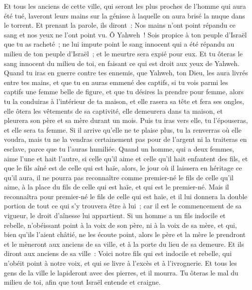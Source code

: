 \begin{multicols}{2}
Et tous les anciens de cette ville, qui seront les plus proches de l'homme qui aura été tué, laveront leurs mains sur la génisse à laquelle on aura brisé la nuque dans le torrent.
Et prenant la parole, ils diront~: Nos mains n'ont point répandu ce sang et nos yeux ne l'ont point vu.
Ô Yahweh~! Sois propice à ton peuple d'Israël que tu as racheté~; ne lui impute point le sang innocent qui a été répandu au milieu de ton peuple d'Israël~; et le meurtre sera expié pour eux.
Et tu ôteras le sang innocent du milieu de toi, en faisant ce qui est droit aux yeux de Yahweh.
Quand tu iras en guerre contre tes ennemis, que Yahweh, ton Dieu, les aura livrés entre tes mains, et que tu en auras emmené des captifs,
si tu vois parmi les captifs une femme belle de figure, et que tu désires la prendre pour femme,
alors tu la conduiras à l'intérieur de ta maison, et elle rasera sa tête et fera ses ongles,
elle ôtera les vêtements de sa captivité, elle demeurera dans ta maison, et pleurera son père et sa mère durant un mois. Puis tu iras vers elle, tu l'épouseras, et elle sera ta femme.
Si il arrive qu'elle ne te plaise plus, tu la renverras où elle voudra, mais tu ne la vendras certainement pas pour de l'argent ni la traiteras en esclave, parce que tu l'auras humiliée.
Quand un homme, qui a deux femmes, aime l'une et hait l'autre, si celle qu'il aime et celle qu'il hait enfantent des fils, et que le fils aîné est de celle qui est haïe,
alors, le jour où il laissera en héritage ce qu'il aura, il ne pourra pas reconnaître comme premier-né le fils de celle qu'il aime, à la place du fils de celle qui est haïe, et qui est le premier-né.
Mais il reconnaîtra pour premier-né le fils de celle qui est haïe, et il lui donnera la double portion de tout ce qui s'y trouvera être à lui~; car il est le commencement de sa vigueur, le droit d'aînesse lui appartient.
Si un homme a un fils indocile et rebelle, n'obéissant point à la voix de son père, ni à la voix de sa mère, et qui, bien qu'ils l'aient châtié, ne les écoute point,
alors le père et la mère le prendront et le mèneront aux anciens de sa ville, et à la porte du lieu de sa demeure.
Et ils diront aux anciens de sa ville~: Voici notre fils qui est indocile et rebelle, qui n'obéit point à notre voix, et qui se livre à l'excès et à l'ivrognerie.
Et tous les gens de la ville le lapideront avec des pierres, et il mourra. Tu ôteras le mal du milieu de toi, afin que tout Israël entende et craigne.

\end{multicols}
